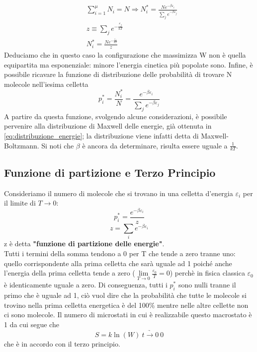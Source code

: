 \documentclass[
10pt, %
a4paper, %
oneside, %
headinclude,footinclude, %
BCOR5mm, %
]{scrartcl}
\begin{document}
\begin{align*}
	&\sum_{i=1}^\mu N_i = N \Rightarrow N_i^* = \frac{Ne^{-\beta\varepsilon_i}}{\sum_je^{-\beta\varepsilon_j}}\\
	&z\equiv \sum_je^{-\frac{\varepsilon_j}{kT}}\\
	&N_i^* = \frac{Ne^{-\frac{\varepsilon_j}{kT}}}{z}
\end{align*} 
Deduciamo che in questo caso la configurazione che massimizza W non è quella equipartita ma esponenziale: minore l'energia cinetica più popolate sono. 
Infine, è possibile ricavare la funzione di distribuzione delle probabilità di trovare N molecole nell'iesima celletta 
\[p_i^*=\frac{N_i^*}{N}=\frac{e^{-\beta \varepsilon_i}}{\sum_j e^{-\beta \varepsilon_j}}\]
A partire da questa funzione, svolgendo alcune considerazioni, è possibile pervenire alla distribuzione di Maxwell delle energie, già ottenuta in \ref{eq:distribuzione_energie}; la distribuzione viene infatti detta di Maxwell-Boltzmann. Si noti che \(\beta\) è ancora da determinare, risulta essere uguale a $\frac{1}{kT}$. 

\subsection{Funzione di partizione e Terzo Principio}
Consideriamo il numero di molecole che si trovano in una celletta d'energia $\varepsilon_i$ per il limite di \(T\to 0\):
\[p_i^*= \frac{e^{-\beta \varepsilon_i}}{z}\]
\[z=\sum_ie^{-\beta \varepsilon_i}\]
z è detta \textbf{"funzione di partizione delle energie"}.\\
Tutti i termini della somma tendono a 0 per T che tende a zero tranne uno: quello corrispondente alla prima celletta che sarà uguale ad 1 poiché anche l'energia della prima celletta tende a zero ($\lim\limits_{T\to 0}\frac{\varepsilon_0}{T}=0$) perchè in fisica classica $\varepsilon_0$ è identicamente uguale a zero. Di conseguenza, tutti i \(p_i^*\) sono nulli tranne il primo che è uguale ad 1, ciò vuol dire che la probabilità che tutte le molecole si trovino nella prima celletta energetica è del 100\% mentre nelle altre cellette non ci sono molecole. Il numero di microstati in cui è realizzabile questo macrostato è 1 da cui segue che 
\[S=k\ln(W)\ \underrightarrow{t\to0}\ 0\]
che è in accordo con il terzo principio. 
\end{document}
